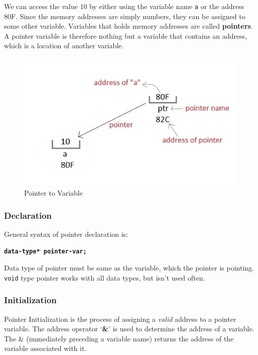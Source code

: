 \documentclass[11pt,a4paper]{article}
\begin{document}
We can access the value 10 by either using the variable name \texttt{a} or the address 80F. Since the memory addresses are simply numbers, they can be assigned to some other variable. Variables that holds memory addresses are called \textbf{pointers}. A pointer variable is therefore nothing but a variable that contains an address, which is a location of another variable. 

\begin{figure}[ht]
\begin{center}
\includegraphics[scale=0.8]{pointer_to_variable.jpg}
\caption{Pointer to Variable}
\label{Pointer}
\end{center}
\end{figure}

\subsubsection*{Declaration} 
General syntax of pointer declaration is:

\textbf{\texttt{data-type* pointer-var;}}

Data type of pointer must be same as the variable, which the pointer is pointing. \lstinline!void! type pointer works with all data types, but isn't used often.

\subsubsection*{Initialization}
Pointer Initialization is the process of assigning a \emph{valid} address to a pointer variable.  The address operator `\textbf{\&}' is used to determine the address of a variable. The \& (immediately preceding a variable name) returns the address of the variable associated with it.
\end{document}
